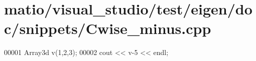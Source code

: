 \hypertarget{matio_2visual__studio_2test_2eigen_2doc_2snippets_2_cwise__minus_8cpp_source}{}\section{matio/visual\+\_\+studio/test/eigen/doc/snippets/\+Cwise\+\_\+minus.cpp}
\label{matio_2visual__studio_2test_2eigen_2doc_2snippets_2_cwise__minus_8cpp_source}

\begin{DoxyCode}
00001 Array3d v(1,2,3);
00002 cout << v-5 << endl;
\end{DoxyCode}
